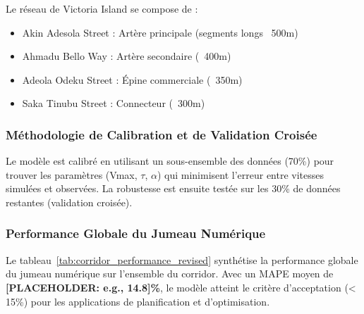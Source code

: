 Le réseau de Victoria Island se compose de :
\begin{itemize}
    \item Akin Adesola Street : Artère principale (segments longs ~500m)
    \item Ahmadu Bello Way : Artère secondaire (~400m)
    \item Adeola Odeku Street : Épine commerciale (~350m)
    \item Saka Tinubu Street : Connecteur (~300m)
\end{itemize}

\subsubsection{Méthodologie de Calibration et de Validation Croisée}
\label{subsec:strategie_calibration_revised}

Le modèle est calibré en utilisant un sous-ensemble des données (70\%) pour trouver les paramètres (Vmax, $\tau$, $\alpha$) qui minimisent l'erreur entre vitesses simulées et observées. La robustesse est ensuite testée sur les 30\% de données restantes (validation croisée).

\subsubsection{Performance Globale du Jumeau Numérique}
\label{subsec:performance_globale_jumeau}

Le tableau~\ref{tab:corridor_performance_revised} synthétise la performance globale du jumeau numérique sur l'ensemble du corridor. Avec un MAPE moyen de \textbf{[PLACEHOLDER: e.g., 14.8]\%}, le modèle atteint le critère d'acceptation (< 15\%) pour les applications de planification et d'optimisation.

